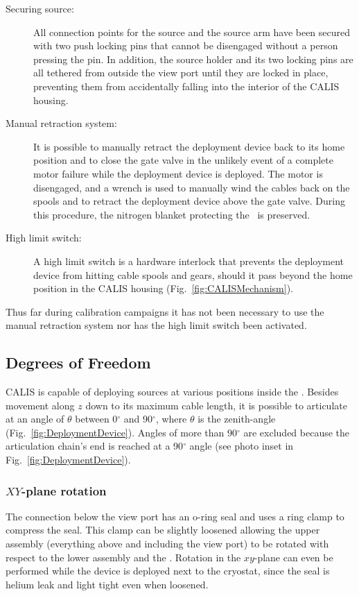 \begin{description}
\item[Securing source:] 
All connection points for the source and the source arm have been secured with two push locking pins that cannot be disengaged without a person pressing the pin. In addition, the source holder and its two locking pins are all tethered from outside the view port until they are locked in place, preventing them from accidentally falling into the interior of the CALIS housing.

\item[Manual retraction system:]
It is possible to manually retract the deployment device back to its home position and to close the gate valve in the unlikely event of a complete motor failure while the deployment device is deployed. The motor is disengaged, and a wrench is used to manually wind the cables back on the spools and to retract the deployment device above the gate valve. During this procedure, the nitrogen blanket protecting the \lsv\ is preserved. 
   
\item[High limit switch:]
A high limit switch is a hardware interlock that prevents the deployment device from hitting cable spools and gears, should it pass beyond the home position in the CALIS housing (Fig.~\ref{fig:CALISMechanism}). 
\end{description}

Thus far during calibration campaigns it has not been necessary to use the manual retraction system nor has the high limit switch been activated.
	

\subsection{Degrees of Freedom}

CALIS is capable of deploying sources at various positions inside the \lsv. Besides movement along $z$ down to its maximum cable length, it is possible to articulate at an angle of $\theta$ between 0$^{\circ}$ and 90$^{\circ}$, where $\theta$ is the zenith-angle (Fig.~\ref{fig:DeploymentDevice}). Angles of more than 90$^{\circ}$ are excluded because the articulation chain's end is reached at a 90$^{\circ}$ angle (see photo inset in Fig.~\ref{fig:DeploymentDevice}).

\subsubsection*{$XY$-plane rotation}\label{sec:XYrotation}
The connection below the view port has an o-ring seal and uses a ring clamp to compress the seal. This clamp can be slightly loosened allowing the upper assembly (everything above and including the view port) to be rotated with respect to the lower assembly and the \tpc. Rotation in the $xy$-plane can even be performed while the device is deployed next to the cryostat, since the seal is helium leak and light tight even when loosened.

